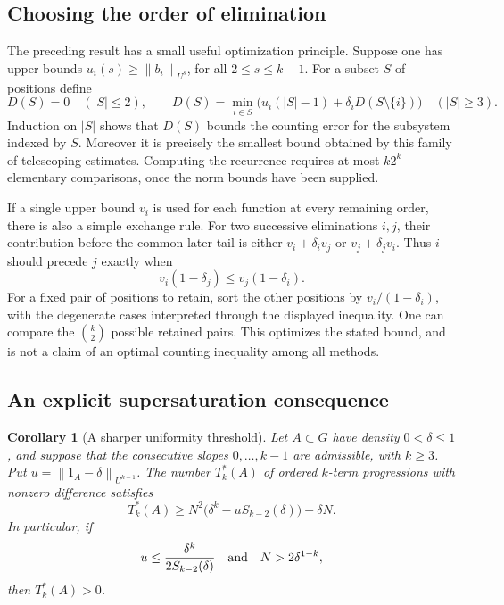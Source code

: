 \documentclass[11pt,letterpaper]{article}
\numberwithin{equation}{section}
\newtheorem{corollary}[theorem]{Corollary}
\theoremstyle{definition}
\theoremstyle{remark}
\newcommand{\1}{\mathbf 1}
\newcommand{\norm}[1]{\left\|#1\right\|}
\begin{document}
\subsection{Choosing the order of elimination}

The preceding result has a small useful optimization principle.  Suppose
one has upper bounds \(u_i(s)\geq\norm{b_i}_{U^s}\), for all
\(2\leq s\leq k-1\).  For a subset \(S\) of positions define
\[
 D(S)=0\quad(|S|\leq2),\qquad
 D(S)=\min_{i\in S}\bigl(u_i(|S|-1)+\delta_iD(S\setminus\{i\})\bigr)
 \quad(|S|\geq3).
\]
Induction on \(|S|\) shows that \(D(S)\) bounds the counting error for
the subsystem indexed by \(S\).  Moreover it is precisely the smallest
bound obtained by this family of telescoping estimates.  Computing the
recurrence requires at most \(k2^k\) elementary comparisons, once the
norm bounds have been supplied.

If a single upper bound \(v_i\) is used for each function at every
remaining order, there is also a simple exchange rule.  For two successive
eliminations \(i,j\), their contribution before the common later tail is
either \(v_i+\delta_i v_j\) or \(v_j+\delta_jv_i\).
Thus \(i\) should precede \(j\) exactly when
\[
 v_i(1-\delta_j)\leq v_j(1-\delta_i).
\]
For a fixed pair of positions to retain, sort the other positions by
\(v_i/(1-\delta_i)\), with the degenerate cases interpreted through the
displayed inequality.  One can compare the \(\binom{k}{2}\) possible
retained pairs.  This optimizes the stated bound, and is not a claim of
an optimal counting inequality among all methods.

\subsection{An explicit supersaturation consequence}

\begin{corollary}[A sharper uniformity threshold]\label{gsr:cc:04:prog:super}
Let \(A\subset G\) have density \(0<\delta\leq1\), and suppose that
the consecutive slopes \(0,\ldots,k-1\) are admissible, with \(k\geq3\).
Put \(u=\norm{1_A-\delta}_{U^{k-1}}\).  The number \(T_k^*(A)\)
of ordered \(k\)-term progressions with nonzero difference satisfies
\begin{equation}\label{gsr:cc:04:prog:nonconstant}
 T_k^*(A)\geq
 N^2\bigl(\delta^k-uS_{k-2}(\delta)\bigr)-\delta N.
\end{equation}
In particular, if
\[
 u\leq\frac{\delta^k}{2S_{k-2}(\delta)}
 \quad\hbox{and}\quad N>2\delta^{1-k},
\]
then \(T_k^*(A)>0\).
\end{corollary}
\end{document}

